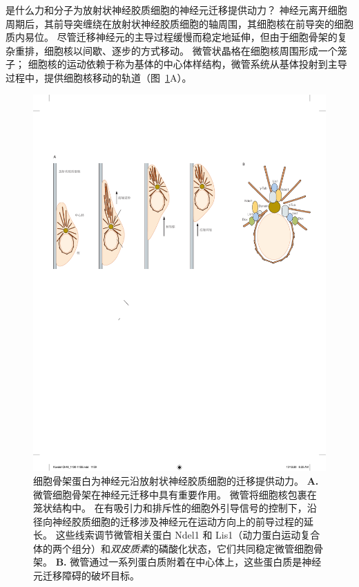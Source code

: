 是什么力和分子为放射状神经胶质细胞的神经元迁移提供动力？
神经元离开细胞周期后，其前导突缠绕在放射状神经胶质细胞的轴周围，其细胞核在前导突的细胞质内易位。
尽管迁移神经元的主导过程缓慢而稳定地延伸，但由于细胞骨架的复杂重排，细胞核以间歇、逐步的方式移动。 
微管状晶格在细胞核周围形成一个笼子；
细胞核的运动依赖于称为基体的中心体样结构，微管系统从基体投射到主导过程中，提供细胞核移动的轨道（图~\ref{fig:46_7}A）。


\begin{figure}[htbp]
	\centering
	\includegraphics[width=1.0\linewidth]{chap46/fig_46_7}
	\caption{细胞骨架蛋白为神经元沿放射状神经胶质细胞的迁移提供动力。
		\textbf{A.} 微管细胞骨架在神经元迁移中具有重要作用。
		微管将细胞核包裹在笼状结构中。
		在有吸引力和排斥性的细胞外引导信号的控制下，沿径向神经胶质细胞的迁移涉及神经元在运动方向上的前导过程的延长。
		这些线索调节微管相关蛋白 Ndel1 和 Lis1（动力蛋白运动复合体的两个组分）和\textit{双皮质素}的磷酸化状态，它们共同稳定微管细胞骨架\cite{gleeson2000neuronal}。
		\textbf{B.} 微管通过一系列蛋白质附着在中心体上，这些蛋白质是神经元迁移障碍的破坏目标。}
	\label{fig:46_7}
\end{figure}


